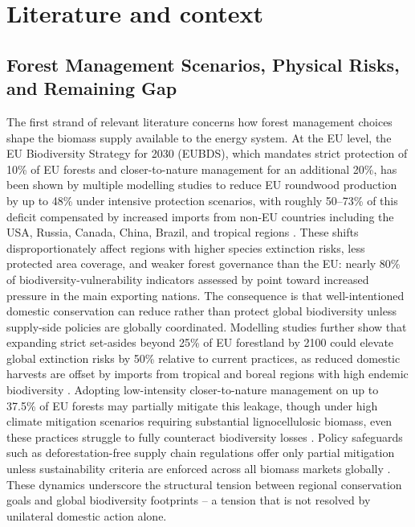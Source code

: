 \documentclass{article}
\begin{document}
\section{Literature and context}
\label{sec:lit_context}

\subsection{Forest Management Scenarios, Physical Risks, and Remaining Gap}

The first strand of relevant literature concerns how forest management choices shape the biomass supply available to the energy system. At the EU level, the EU Biodiversity Strategy for 2030 (EUBDS), which mandates strict protection of 10\% of EU forests and closer-to-nature management for an additional 20\%, has been shown by multiple modelling studies to reduce EU roundwood production by up to 48\% under intensive protection scenarios, with roughly 50--73\% of this deficit compensated by increased imports from non-EU countries including the USA, Russia, Canada, China, Brazil, and tropical regions \citep{fischerLeakageBiodiversityRisks2023,schierAssessmentPossibleProduction2022,kallioImpactsEUBiodiversity2025}. These shifts disproportionately affect regions with higher species extinction risks, less protected area coverage, and weaker forest governance than the EU: nearly 80\% of biodiversity-vulnerability indicators assessed by \citet{fischerLeakageBiodiversityRisks2023} point toward increased pressure in the main exporting nations. The consequence is that well-intentioned domestic conservation can reduce rather than protect global biodiversity unless supply-side policies are globally coordinated. Modelling studies further show that expanding strict set-asides beyond 25\% of EU forestland by 2100 could elevate global extinction risks by 50\% relative to current practices, as reduced domestic harvests are offset by imports from tropical and boreal regions with high endemic biodiversity \citep{rosaCanForestManagement2023}. Adopting low-intensity closer-to-nature management on up to 37.5\% of EU forests may partially mitigate this leakage, though under high climate mitigation scenarios requiring substantial lignocellulosic biomass, even these practices struggle to fully counteract biodiversity losses \citep{rosaCanForestManagement2023}. Policy safeguards such as deforestation-free supply chain regulations offer only partial mitigation unless sustainability criteria are enforced across all biomass markets globally \citep{fischerLeakageBiodiversityRisks2023,zamaniDeforestationFreeTradeImpact2025}. These dynamics underscore the structural tension between regional conservation goals and global biodiversity footprints -- a tension that is not resolved by unilateral domestic action alone.
\end{document}
